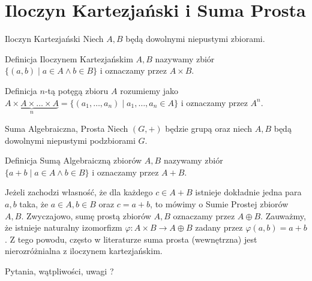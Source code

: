 \documentclass{beamer}
\let\phi\varphi
\begin{document}
\section{Iloczyn Kartezjański i Suma Prosta}
\begin{frame}{Iloczyn Kartezjański}
    Niech $A,B$ będą dowolnymi niepustymi zbiorami.
    \begin{block}{Definicja}
         \alert{Iloczynem Kartezjańskim} $A,B$ nazywamy zbiór
        $\{(a,b) \mid a \in A \land b \in B\}$ i oznaczamy przez $A \times B$.
    \end{block}
    \begin{block}{Definicja}
        $n$-tą potęgą zbioru $A$ rozumiemy jako $ \underbrace{A \times A \times \ldots \times A}_{n} 
        = \{(a_1,\ldots, a_n) \mid a_1,\ldots,a_n \in A \}$ i oznaczamy  przez $A^n$.
    \end{block}
\end{frame}

\begin{frame}{Suma Algebraiczna, Prosta}
    Niech $(G, +)$ będzie grupą oraz niech $A,B$ będą dowolnymi niepustymi podzbiorami $G$.
    \begin{block}{Definicja}
        \alert{Sumą Algebraiczną} zbiorów $A,B$ nazywamy zbiór $\{ a + b \mid a \in A \land b \in B\}$
        i oznaczamy przez $A + B$.
    \end{block}
    Jeżeli zachodzi własność, że dla każdego $c \in A +B $ istnieje dokładnie jedna para $a,b$ taka, że $a \in A, b \in B$ oraz $c = a +b$, 
    to mówimy o \alert{Sumie Prostej} zbiorów $A,B$. Zwyczajowo, sumę prostą zbiorów $A,B$ oznaczamy przez $A \oplus B$. 
    \pause 
    Zauważmy, że istnieje naturalny izomorfizm  $ \phi : A \times B \rightarrow A \oplus B$ zadany przez
    $\phi(a,b) = a + b$. Z tego powodu, często w literaturze suma prosta (wewnętrzna) jest nierozróżnialna z iloczynem kartezjańskim. 
\end{frame}

\begin{frame}
        \centering 
        \LARGE Pytania, wątpliwości, uwagi ? 
\end{frame}
\end{document}
